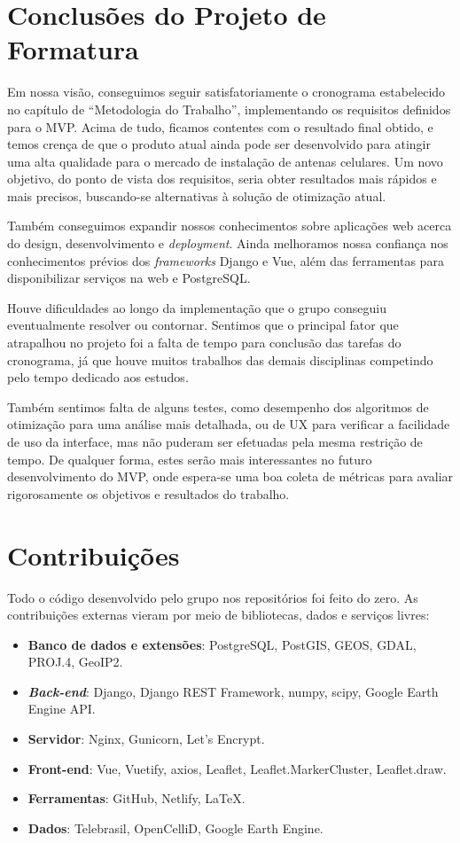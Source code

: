 \documentclass[]{politex}
\begin{document}
\section{Conclusões do Projeto de Formatura}

Em nossa visão, conseguimos seguir satisfatoriamente o cronograma estabelecido
no capítulo de ``Metodologia do Trabalho'', implementando os requisitos
definidos para o MVP. Acima de tudo, ficamos contentes com o resultado final
obtido, e temos crença de que o produto atual ainda pode ser desenvolvido para
atingir uma alta qualidade para o mercado de instalação de antenas celulares. Um
novo objetivo, do ponto de vista dos requisitos, seria obter resultados mais
rápidos e mais precisos, buscando-se alternativas à solução de otimização atual.

Também conseguimos expandir nossos conhecimentos sobre aplicações web acerca do
design, desenvolvimento e \textit{deployment}. Ainda melhoramos nossa confiança
nos conhecimentos prévios dos \textit{frameworks} Django e Vue, além das
ferramentas para disponibilizar serviços na web e PostgreSQL.

Houve dificuldades ao longo da implementação que o grupo conseguiu eventualmente
resolver ou contornar. Sentimos que o principal fator que atrapalhou no projeto
foi a falta de tempo para conclusão das tarefas do cronograma, já que houve
muitos trabalhos das demais disciplinas competindo pelo tempo dedicado aos
estudos.

Também sentimos falta de alguns testes, como desempenho dos algoritmos de
otimização para uma análise mais detalhada, ou de UX para verificar a facilidade
de uso da interface, mas não puderam ser efetuadas pela mesma restrição de
tempo. De qualquer forma, estes serão mais interessantes no futuro
desenvolvimento do MVP, onde espera-se uma boa coleta de métricas para avaliar
rigorosamente os objetivos e resultados do trabalho.

\section{Contribuições}

Todo o código desenvolvido pelo grupo nos repositórios foi feito do zero. As
contribuições externas vieram por meio de bibliotecas, dados e serviços livres:

\begin{itemize}
\item \textbf{Banco de dados e extensões}: PostgreSQL, PostGIS, GEOS, GDAL,
PROJ.4, GeoIP2.
\item \textbf{\textit{Back-end}}: Django, Django REST Framework, numpy, scipy,
Google Earth Engine API.
\item \textbf{Servidor}: Nginx, Gunicorn, Let's Encrypt.
\item \textbf{Front-end}: Vue, Vuetify, axios, Leaflet, Leaflet.MarkerCluster,
Leaflet.draw.
\item \textbf{Ferramentas}: GitHub, Netlify, LaTeX.
\item \textbf{Dados}: Telebrasil, OpenCelliD, Google Earth Engine.
\end{itemize}
\end{document}
